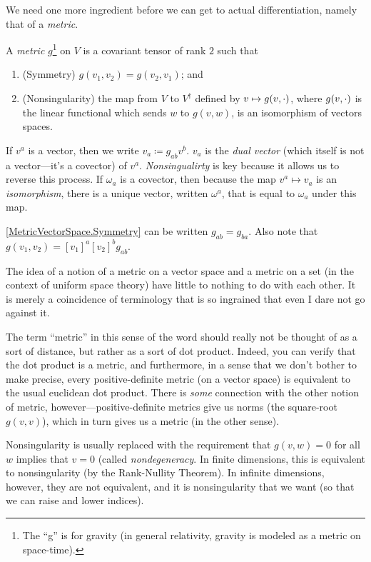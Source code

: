 We need one more ingredient before we can get to actual differentiation, namely that of a \emph{metric}.
\begin{dfn}\label{MetricVectorSpace}
A \emph{metric} $g$\footnote{The ``g'' is for gravity (in general relativity, gravity is modeled as a metric on space-time).} on $V$ is a covariant tensor of rank $2$ such that
\begin{enumerate}
\item \label{MetricVectorSpace.Symmetry}(Symmetry) $g(v_1,v_2)=g(v_2,v_1)$; and
\item \label{MetricVectorSpace.Nonsingularity}(Nonsingularity) the map from $V$ to $V^{\dagger}$ defined by $v\mapsto g(v,{\cdot} )$, where $g(v,{\cdot} )$ is the linear functional which sends $w$ to $g(v,w)$, is an isomorphism of vectors spaces.
\end{enumerate}
\begin{rmk}
If $v^a$ is a vector, then we write $v_a\coloneqq g_{ab}v^b$.  $v_a$ is the \emph{dual vector} (which itself is not a vector---it's a covector) of $v^a$.  \emph{Nonsingualirty} is key because it allows us to reverse this process.  If $\omega _a$ is a covector, then because the map $v^a\mapsto v_a$ is an \emph{isomorphism}, there is a unique vector, written $\omega ^a$, that is equal to $\omega _a$ under this map.
\end{rmk}
\begin{rmk}
\ref{MetricVectorSpace.Symmetry} can be written $g_{ab}=g_{ba}$.  Also note that $g(v_1,v_2)=[v_1]^a[v_2]^bg_{ab}$.
\end{rmk}
\begin{rmk}
The idea of a notion of a metric on a vector space and a metric on a set (in the context of uniform space theory) have little to nothing to do with each other.  It is merely a coincidence of terminology that is so ingrained that even I dare not go against it.
\end{rmk}
\begin{rmk}
The term ``metric'' in this sense of the word should really not be thought of as a sort of distance, but rather as a sort of dot product.  Indeed, you can verify that the dot product is a metric, and furthermore, in a sense that we don't bother to make precise, every positive-definite metric (on a vector space) is equivalent to the usual euclidean dot product.  There is \emph{some} connection with the other notion of metric, however---positive-definite metrics give us norms (the square-root $g(v,v)$), which in turn gives us a metric (in the other sense).
\end{rmk}
\begin{rmk}
Nonsingularity is usually replaced with the requirement that $g(v,w)=0$ for all $w$ implies that $v=0$ (called \emph{nondegeneracy}.  In finite dimensions, this is equivalent to nonsingularity (by the Rank-Nullity Theorem).  In infinite dimensions, however, they are not equivalent, and it is nonsingularity that we want (so that we can raise and lower indices).
\end{rmk}
\end{dfn}
